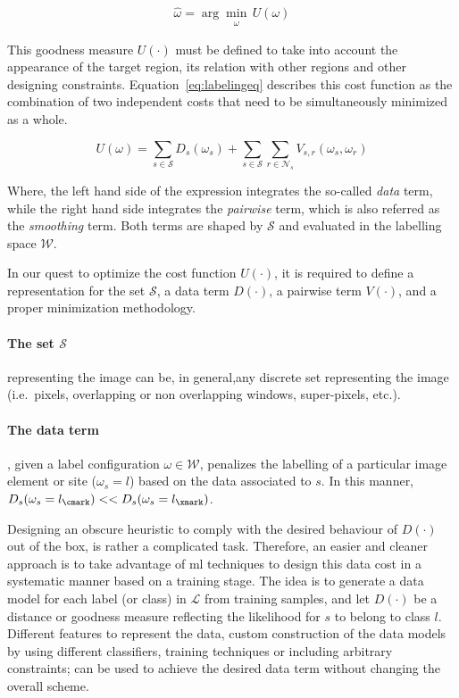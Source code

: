 \begin{equation}
\hat{\omega} = \arg \min_{\substack{\omega}} \,U(\omega)
\label{eq:costMin}
\end{equation}


This goodness measure $U(\cdot)$ must be defined to take into account the appearance of the target region, its relation with other regions and other designing constraints.
Equation~\eqref{eq:labelingeq} describes this cost function as the combination of two independent costs that need to be simultaneously minimized as a whole.

\begin{equation}
  U(\omega) = \sum_{s\in \mathcal{S}} D_s(\omega_s) + \sum_{s \in \mathcal{S}}\sum_{r \in \mathcal{N}_{s}} V_{s,r}(\omega_s,\omega_r)
  \label{eq:labelingeq}
\end{equation}

Where, the left hand side of the expression integrates the so-called \emph{data} term, while the right hand side integrates the \emph{pairwise} term, which is also referred as the \emph{smoothing} term.
Both terms are shaped by $\mathcal{S}$ and evaluated in the labelling space $\mathcal{W}$.

{\color{red}In our quest to optimize the cost function $U(\cdot)$, it is required to define a representation for the set $\mathcal{S}$, a data term $D(\cdot)$, a pairwise term $V(\cdot)$, and a proper minimization methodology.}

\paragraph{The set $\mathcal{S}$}
representing the image can be, in general,any discrete set representing the image (i.e.\, pixels, overlapping or non overlapping windows, super-pixels, etc.). 

\paragraph{The data term} \label{sec:method:dataTerm}
, given a label configuration $\omega \in \mathcal{W}$, penalizes the labelling of a particular image element or site ($\omega_s = l$) based on the data associated to $s$.
In this manner, $D_s(\omega_s=l_\cmark) << D_s(\omega_s=l_\xmark)$.

Designing an obscure heuristic to comply with the desired behaviour of $D(\cdot)$ out of the box, is rather a complicated task.
{\color{blue}
Therefore, an easier and cleaner approach is to take advantage of \ac{ml} techniques to design this data cost in a systematic manner based on a training stage. 
The idea is to generate a data model for each label (or class) in $\mathcal{L}$ from training samples, and let $D(\cdot)$ be a distance or goodness measure reflecting the likelihood for $s$ to belong to class $l$.
Different features to represent the data, custom construction of the data models by using different classifiers, training techniques or including arbitrary constraints; can be used to achieve the desired data term without changing the overall scheme.}

